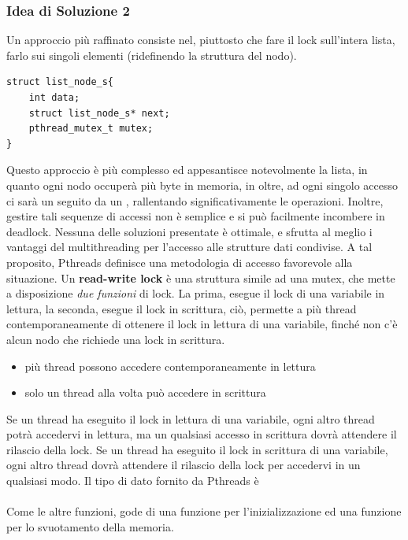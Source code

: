 \documentclass[10pt, letterpaper]{report}
\begin{document}
\subsubsection{Idea di Soluzione 2}
Un approccio più raffinato consiste nel, piuttosto che fare il lock sull'intera lista, farlo sui singoli elementi (ridefinendo la struttura del nodo).
\begin{lstlisting}[style=CStyle]
struct list_node_s{
    int data;
    struct list_node_s* next;
    pthread_mutex_t mutex;
}
\end{lstlisting}
Questo approccio è più complesso ed appesantisce notevolmente la lista, in quanto ogni nodo occuperà più byte in memoria, in oltre, ad ogni singolo accesso ci sarà un  seguito da un , rallentando significativamente le operazioni. Inoltre, gestire tali sequenze di accessi non è semplice e si può facilmente incombere in deadlock.\acc 
Nessuna delle soluzioni presentate è ottimale, e sfrutta al meglio i vantaggi del multithreading per l'accesso alle strutture dati condivise. A tal proposito, Pthreads definisce una metodologia di accesso favorevole alla situazione.\acc 
{} Un \textbf{read-write lock} è una struttura simile ad una mutex, che mette a disposizione \textit{due funzioni} di lock. \acc 
La prima, esegue il lock di una variabile in lettura, la seconda, esegue il lock  in scrittura, ciò, permette a più thread contemporaneamente di ottenere il lock in lettura di una variabile, finché non c'è alcun nodo che richiede una lock in scrittura.\begin{itemize}
    \item più thread possono accedere contemporaneamente in lettura
    \item solo un thread alla volta può accedere in scrittura
\end{itemize}
Se un thread ha eseguito il lock in lettura di una variabile, ogni altro thread potrà accedervi in lettura, ma un qualsiasi accesso in scrittura dovrà attendere il rilascio della lock. \acc 
Se un thread ha eseguito il lock in scrittura di una variabile,  ogni altro thread dovrà attendere il rilascio della lock per accedervi in un qualsiasi modo.\acc 
Il tipo di dato fornito da Pthreads è \\ 
\\ 
Come le altre funzioni, gode di una funzione  per l'inizializzazione ed una funzione  per lo svuotamento della memoria.
\end{document}
